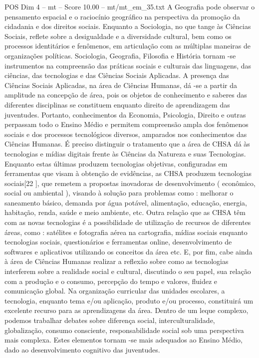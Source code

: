\begin{textsample}{POS Dim 4 – mt – Score 10.00 – mt/mt\_em\_35.txt}
A Geografia pode observar o pensamento espacial e o raciocínio geográfico na perspectiva da promoção da cidadania e dos direitos sociais.
Enquanto a Sociologia, no que tange às Ciências Sociais, reflete sobre a desigualdade e a diversidade cultural, bem como os processos identitários e fenômenos, em articulação com as múltiplas maneiras de organizações políticas.
Sociologia, Geografia, Filosofia e História tornam -se instrumentos na compreensão das práticas sociais e culturais das linguagens, das ciências, das tecnologias e das Ciências Sociais Aplicadas.
A presença das Ciências Sociais Aplicadas, na área de Ciências Humanas, dá -se a partir da amplitude na concepção de área, pois os objetos de conhecimento e saberes das diferentes disciplinas se constituem enquanto direito de aprendizagem das juventudes.
Portanto, conhecimentos da Economia, Psicologia, Direito e outras perpassam todo o Ensino Médio e permitem compreensão ampla dos fenômenos sociais e dos processos tecnológicos diversos, amparados nos conhecimentos das Ciências Humanas.
É preciso distinguir o tratamento que a área de CHSA dá às tecnologias e mídias digitais frente às Ciências da Natureza e suas Tecnologias.
Enquanto estas últimas produzem tecnologias objetivas, configuradas em ferramentas que visam à obtenção de evidências, as CHSA produzem tecnologias sociais[22 ], que remetem a propostas inovadoras de desenvolvimento ( econômico, social ou ambiental ), visando à solução para problemas como : melhorar o saneamento básico, demanda por água potável, alimentação, educação, energia, habitação, renda, saúde e meio ambiente, etc.
Outra relação que as CHSA têm com as novas tecnologias é a possibilidade de utilização de recursos de diferentes áreas, como : satélites e fotografia aérea na cartografia, mídias sociais enquanto tecnologias sociais, questionários e ferramentas online, desenvolvimento de softwares e aplicativos utilizando os conceitos da área etc.
E, por fim, cabe ainda à área de Ciências Humanas realizar a reflexão sobre como as tecnologias interferem sobre a realidade social e cultural, discutindo o seu papel, sua relação com a produção e o consumo, percepção do tempo e valores, fluidez e comunicação global.
Na organização curricular das unidades escolares, a tecnologia, enquanto tema e/ou aplicação, produto e/ou processo, constituirá um excelente recurso para as aprendizagens da área.
Dentro de um leque complexo, podemos trabalhar debates sobre diferença social, interculturalidade, globalização, consumo consciente, responsabilidade social sob uma perspectiva mais complexa.
Estes elementos tornam -se mais adequados ao Ensino Médio, dado ao desenvolvimento cognitivo das juventudes.

\end{textsample}
